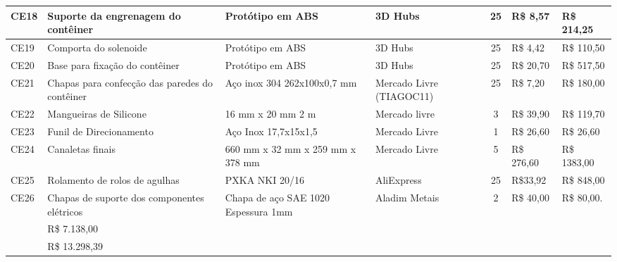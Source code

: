 \begin{table}[H]
\begin{adjustbox}{max width = 1\textwidth}
\begin{tabular}{|l|G{4cm}|C{2.4cm}|L{3.2cm}|c|l|l|}
        CE18 & Suporte da engrenagem do contêiner & Protótipo em ABS & 3D Hubs & 25  & R\$ 8,57 & R\$ 214,25  \\ \hline
        CE19 & Comporta do solenoide & Protótipo em ABS & 3D Hubs & 25  & R\$ 4,42 & R\$ 110,50  \\ \hline
        CE20 & Base para fixação do contêiner & Protótipo em ABS & 3D Hubs & 25  & R\$ 20,70 & R\$ 517,50  \\ \hline
        CE21 & Chapas para confecção das paredes do contêiner & Aço inox 304 262x100x0,7 mm & Mercado Livre (TIAGOC11) & 25  & R\$ 7,20 & R\$ 180,00  \\ \hline
        CE22 & Mangueiras de Silicone & 16 mm x 20 mm 2 m & Mercado livre & 3 & R\$ 39,90 & R\$ 119,70 \\ \hline
        CE23 & Funil de Direcionamento & Aço Inox 17,7x15x1,5 & Mercado Livre & 1 & R\$ 26,60 & R\$ 26,60 \\ \hline
        CE24 & Canaletas finais & 660 mm x 32 mm x 259 mm x 378 mm & Mercado Livre & 5 & R\$ 276,60 & R\$ 1383,00\\ \hline
        CE25 & Rolamento de rolos de agulhas & PXKA NKI 20/16 & AliExpress & 25 & R\$33,92 & R\$ 848,00 \\ \hline
        CE26 & Chapas de suporte dos componentes elétricos &  Chapa de aço SAE 1020 Espessura 1mm & Aladim Metais & 2 & R\$ 40,00 & R\$ 80,00. \\ \hline
        
         & R\$ 7.138,00\\ \hline
        
         & \color{white}R\$ 13.298,39\\ \hline
        \end{tabular}
	\end{adjustbox}
\end{table}


        
